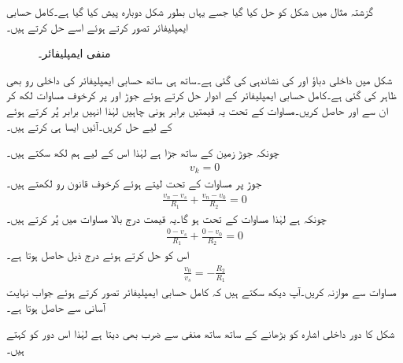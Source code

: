 گزشتہ مثال میں شکل  کو حل کیا گیا جسے یہاں بطور شکل  دوبارہ پیش کیا گیا ہے۔کامل حسابی ایمپلیفائر تصور کرتے ہوئے اسے حل کرتے ہیں۔
\begin{figure}
\centering
{}
\caption{منفی ایمپلیفائر۔}
\label{شکل_حسابی_کامل_حل_الف}
\end{figure}
شکل میں داخلی دباؤ  اور  کی نشاندہی کی گئی ہے۔ساتھ ہی ساتھ حسابی ایمپلیفائر کی داخلی رو  بھی ظاہر کی گئی ہے۔کامل حسابی ایمپلیفائر کے ادوار حل کرتے ہوئے جوڑ  اور  پر کرخوف مساوات لکھ کر ان سے  اور  حاصل کریں۔مساوات  کے تحت یہ قیمتیں برابر ہونی چاہیں لہٰذا انہیں برابر پُر کرتے ہوئے  کے لیے حل کریں۔آئیں ایسا ہی کرتے ہیں۔

چونکہ جوڑ  زمین کے ساتھ جڑا ہے لہٰذا اس کے لیے ہم لکھ سکتے ہیں۔
\begin{align*}
v_k=0
\end{align*}
جوڑ  پر مساوات  کے تحت  لیتے ہوئے کرخوف قانون رو لکھتے ہیں۔
\begin{align*}
\frac{v_n-v_s}{R_1}+\frac{v_n-v_0}{R_2}=0
\end{align*}
چونکہ  ہے لہٰذا مساوات  کے تحت  ہو گا۔یہ قیمت درج بالا مساوات میں پُر کرتے ہیں۔
\begin{align*}
\frac{0-v_s}{R_1}+\frac{0-v_0}{R_2}=0
\end{align*}
اس کو حل کرتے ہوئے درج ذیل حاصل ہوتا ہے۔
\begin{align}
\frac{v_0}{v_s}=-\frac{R_2}{R_1}
\end{align}
مساوات  سے موازنہ کریں۔آپ دیکھ سکتے ہیں کہ کامل حسابی ایمپلیفائر تصور کرتے ہوئے جواب نہایت آسانی سے حاصل ہوتا ہے۔

شکل  کا دور  داخلی اشارہ  کو بڑھانے کے ساتھ ساتھ منفی سے ضرب بھی دیتا ہے لہٰذا اس دور کو  کہتے ہیں۔


